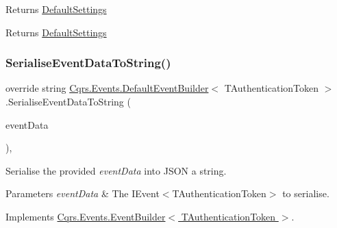 Returns \hyperlink{classCqrs_1_1Events_1_1DefaultEventBuilder_aabead59863bacfed527d85ea789ab881_aabead59863bacfed527d85ea789ab881}{Default\+Settings} 

\begin{DoxyReturn}{Returns}
\hyperlink{classCqrs_1_1Events_1_1DefaultEventBuilder_aabead59863bacfed527d85ea789ab881_aabead59863bacfed527d85ea789ab881}{Default\+Settings}
\end{DoxyReturn}
\mbox{\label{classCqrs_1_1Events_1_1DefaultEventBuilder_afb73a13003a94135e5c97436e7e78e13_afb73a13003a94135e5c97436e7e78e13}} 
\subsubsection{\texorpdfstring{Serialise\+Event\+Data\+To\+String()}{SerialiseEventDataToString()}}
{\footnotesize\ttfamily override string \hyperlink{classCqrs_1_1Events_1_1DefaultEventBuilder}{Cqrs.\+Events.\+Default\+Event\+Builder}$<$ T\+Authentication\+Token $>$.Serialise\+Event\+Data\+To\+String (\begin{DoxyParamCaption}\item[{\hyperlink{interfaceCqrs_1_1Events_1_1IEvent}{I\+Event}$<$ T\+Authentication\+Token $>$}]{event\+Data }\end{DoxyParamCaption})\hspace{0.3cm}{\ttfamily [protected]}, {\ttfamily [virtual]}}



Serialise the provided {\itshape event\+Data}  into J\+S\+ON a string. 


\begin{DoxyParams}{Parameters}
{\em event\+Data} & The I\+Event$<$\+T\+Authentication\+Token$>$ to serialise.\\
\hline
\end{DoxyParams}


Implements \hyperlink{classCqrs_1_1Events_1_1EventBuilder_aefa7bfaea90123e143e108d46efc6603_aefa7bfaea90123e143e108d46efc6603}{Cqrs.\+Events.\+Event\+Builder$<$ T\+Authentication\+Token $>$}.




